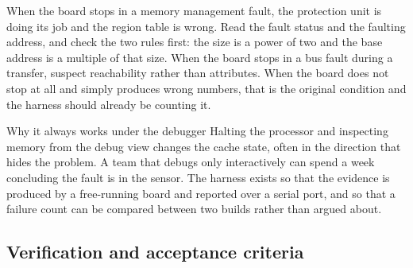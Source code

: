 
When the board stops in a memory management fault, the protection unit is doing
its job and the region table is wrong. Read the fault status and the faulting
address, and check the two rules first: the size is a power of two and the base
address is a multiple of that size. When the board stops in a bus fault during
a transfer, suspect reachability rather than attributes. When the board does
not stop at all and simply produces wrong numbers, that is the original
condition and the harness should already be counting it.

\begin{note}{Why it always works under the debugger}
Halting the processor and inspecting memory from the debug view changes the
cache state, often in the direction that hides the problem. A team that debugs
only interactively can spend a week concluding the fault is in the sensor. The
harness exists so that the evidence is produced by a free-running board and
reported over a serial port, and so that a failure count can be compared
between two builds rather than argued about.
\end{note}

\subsection*{Verification and acceptance criteria}

